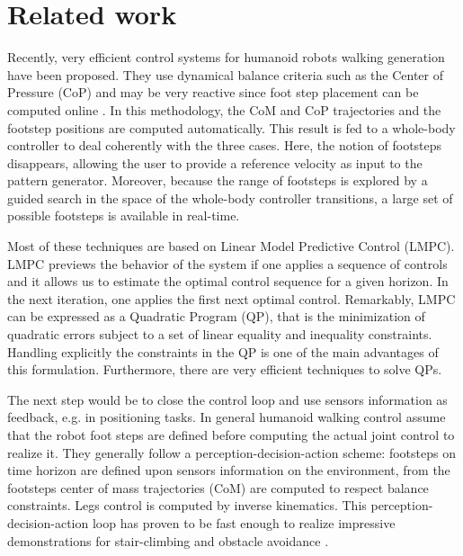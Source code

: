 
\chapter{Related work} 
\label{Chap:Related-Work}

Recently, very efficient control systems for humanoid robots walking generation have been proposed. They use dynamical balance criteria such as the Center of Pressure (CoP) and may be very reactive since foot step placement can be computed online \citep{HerdtAR2010}. In this methodology, the CoM and CoP trajectories and the footstep positions are computed automatically. This result is fed to a whole-body controller to deal coherently with the three cases. Here, the notion of footsteps disappears, allowing the user to provide a reference velocity as input to the pattern generator. Moreover, because the range of footsteps is explored by a guided search in the space of the whole-body controller transitions, a large set of possible footsteps is available in real-time.

Most of these techniques are based on Linear Model Predictive Control (LMPC). LMPC previews the behavior of the system if one applies a sequence of controls and it allows us to estimate the optimal control sequence for a given horizon. In the next iteration, one applies the first next optimal control. Remarkably, LMPC can be expressed as a Quadratic Program (QP), that is the minimization of quadratic errors subject to a set of linear equality and inequality constraints.
Handling explicitly the constraints in the QP is one of the main advantages of this formulation. 
Furthermore, there are very efficient techniques to solve QPs.

The next step would be to close the control loop and use sensors information as feedback, e.g. in positioning tasks. In general humanoid walking control assume that the robot foot steps are defined before computing the actual joint control to realize it. They generally follow a perception-decision-action scheme: footsteps on time horizon are defined upon sensors information on the environment, from the footsteps center of mass trajectories (CoM) are computed to respect balance constraints. Legs control is computed by inverse kinematics. This perception-decision-action loop has proven to be fast enough to realize impressive demonstrations for stair-climbing and obstacle avoidance \citep{Lorch02,Chestnutt07,Michel07,Guttmann08}. 

